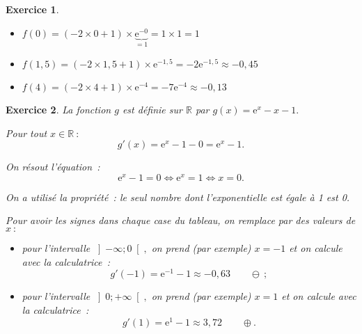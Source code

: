 \documentclass[10pt]{article}
\newtheorem{exo}{Exercice}
\begin{document}
\begin{exo}
\begin{enumerate}
\begin{multicols}{2}
\columnbreak

\begin{itemize}
\item[\textbullet] $f(0)=(-2\times 0 +1)\times\underbrace{\text{e}^{-0}}_{=1}=1\times 1=1$
\item[\textbullet] $f(1,5)=(-2\times 1,5 +1)\times\text{e}^{-1,5}=-2\text{e}^{-1,5}\approx -0,45$
\item[\textbullet] $f(4)=(-2\times 4 +1)\times\text{e}^{-4}=-7\text{e}^{-4}\approx -0,13$
\end{itemize}
\end{multicols}

\end{enumerate}


\end{exo}

\begin{exo}

La fonction $g$ est définie sur $\mathbb{R}$ par $g(x)=\text{e}^x-x-1.$

\medskip

Pour tout $x\in\mathbb{R}~:$
\[g'(x)=\text{e}^x-1-0=\text{e}^x-1.\]

\medskip

\setlength{\columnseprule}{1pt}
\begin{multicols}{2}

On résout l'équation~:
\[\text{e}^x-1=0\iff \text{e}^x=1 \iff x=0.\]

\danger On a utilisé la propriété~: le seul nombre dont l'exponentielle est égale à 1 est 0.

\medskip

Pour avoir les signes dans chaque case du tableau, on remplace par des valeurs de $x~:$

\begin{itemize}
\item[\textbullet] pour l'intervalle $\left]-\infty;0\right[,$ on prend (par exemple) $x=-1$ et on calcule avec la calculatrice~:
\[g'(-1)=\text{e}^{-1}-1\approx -0,63\qquad \ominus ~;\]
\item[\textbullet] pour l'intervalle $\left]0;+\infty\right[,$ on prend (par exemple) $x=1$ et on calcule avec la calculatrice~:
\[g'(1)=\text{e}^{1}-1\approx 3,72\qquad \oplus .\]
\end{itemize}

\columnbreak

\begin{center}


\end{center}
\end{multicols}
\end{exo}
\end{document}
